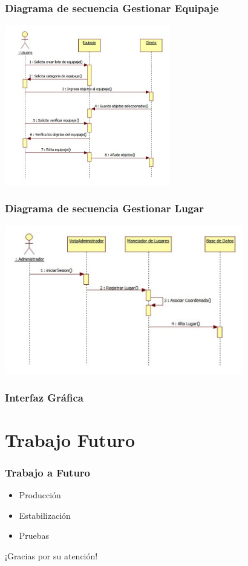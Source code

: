 \documentclass[12pt]{beamer}
\begin{document}
\begin{frame}
	\frametitle{Diagrama de secuencia Gestionar Equipaje}
	\begin{center}
		\includegraphics[height=7cm]{imagenes/secGestionarEquipaje.png}	
	\end{center}
\end{frame}

\begin{frame}
	\frametitle{Diagrama de secuencia Gestionar Lugar}
	\begin{center}
		\includegraphics[height=6.5cm]{imagenes/secGestionarLugar.png}	
	\end{center}
\end{frame}

\begin{frame}
	\frametitle{Interfaz Gráfica}
	\begin{block}{}
   \end{block}
\end{frame}

\section{Trabajo Futuro}

\begin{frame}
	\frametitle{Trabajo a Futuro}
	\begin{block}{}
		\begin{itemize}
	\item Producción
	\item Estabilización
	\item Pruebas
\end{itemize}
	\end{block}

\end{frame}  

\begin{frame}
	\begin{center}
		\Large ¡Gracias por su atención!
	\end{center}
\end{frame}
\end{document}
